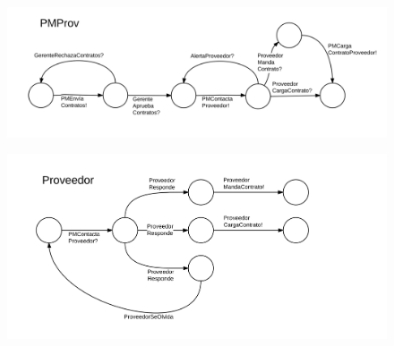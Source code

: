 \begin{figure}[H]
\includegraphics[width=\linewidth]{f5.png}
\end{figure}
\begin{figure}[H]
\includegraphics[width=\linewidth]{f6.png}
\end{figure}
